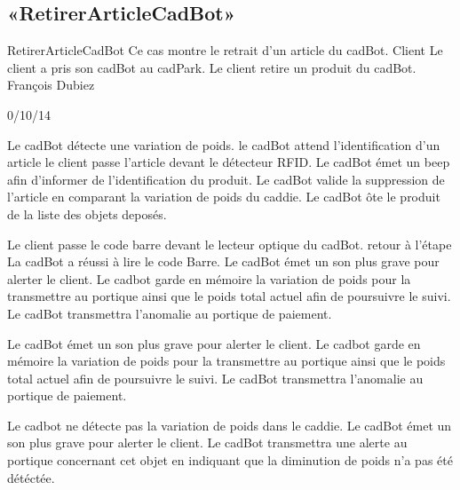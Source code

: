 \subsection{«RetirerArticleCadBot»}

\startCU
\nom RetirerArticleCadBot
\but Ce cas montre le retrait d'un article du cadBot.
\acteur Client
\precondition Le client a pris son cadBot au cadPark.
\declenchement Le client retire un produit du cadBot.
\auteur François Dubiez
\date 30/10/14

\nominal %
\startnominal
\etape Le cadBot détecte une variation de poids.
\etape le cadBot attend l'identification d'un article
 le client passe l'article devant le détecteur RFID.
\etape[RAC:SA1] Le cadBot émet un beep afin d'informer de l'identification du produit.
\etape[RAC:SA3] Le cadBot valide la suppression de l'article en comparant la variation de poids du caddie.
\stopnominal
\postcondition Le cadBot ôte le produit de la liste des objets deposés.

\alternatifs %
  \etape Le client passe le code barre devant le lecteur optique du cadBot.
  \etape retour à l'étape \in[RAC:SA1]
\stopcondition
\postcondition La cadBot a réussi à lire le code Barre.
   \etape Le cadBot émet un son plus grave pour alerter le client.
   \etape Le cadbot garde en mémoire la variation de poids pour la transmettre au portique ainsi que le poids total actuel afin de poursuivre le suivi.
\stopcondition
\postcondition Le cadBot transmettra l'anomalie au portique de paiement.
\stopalternatif

\startalternatif[RAC:SA1]
   \etape Le cadBot émet un son plus grave pour alerter le client.
   \etape Le cadbot garde en mémoire la variation de poids pour la transmettre au portique ainsi que le poids total actuel afin de poursuivre le suivi.
\stopcondition
\postcondition Le cadBot transmettra l'anomalie au portique de paiement.
\stopalternatif

\startalternatif[RAC:SA3]
   \etape Le cadbot ne détecte pas la variation de poids dans le caddie.
   \etape Le cadBot émet un son plus grave pour alerter le client.
\stopcondition
\postcondition Le cadBot transmettra une alerte au portique concernant cet objet en indiquant que la diminution de poids n'a pas été détéctée.
\stopalternatif

\stopCU
